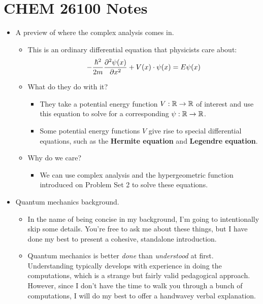 \documentclass[../finalProject.tex]{subfiles}
\begin{document}
\section*{CHEM 26100 Notes}
\begin{itemize}
    \item {}A preview of where the complex analysis comes in.
    \begin{itemize}
        \item This is an ordinary differential equation that physicists care about:
        \begin{equation*}
            -\frac{\hbar^2}{2m}\pdv[2]{\psi(x)}{x}+V(x)\cdot\psi(x) = E\psi(x)
        \end{equation*}
        \item What do they do with it?
        \begin{itemize}
            \item They take a potential energy function $V:\mathbb{R}\to\mathbb{R}$ of interest and use this equation to solve for a corresponding $\psi:\mathbb{R}\to\mathbb{R}$.
            \item Some potential energy functions $V$ give rise to special differential equations, such as the \textbf{Hermite equation} and \textbf{Legendre equation}.
        \end{itemize}
        \item Why do we care?
        \begin{itemize}
            \item We can use complex analysis and the hypergeometric function introduced on Problem Set 2 to solve these equations.
        \end{itemize}
    \end{itemize}
    \item Quantum mechanics background.
    \begin{itemize}
        \item In the name of being concise in my background, I'm going to intentionally skip some details. You're free to ask me about these things, but I have done my best to present a cohesive, standalone introduction.
        \item Quantum mechanics is better \emph{done} than \emph{understood} at first. Understanding typically develops with experience in doing the computations, which is a strange but fairly valid pedagogical approach. However, since I don't have the time to walk you through a bunch of computations, I will do my best to offer a handwavey verbal explanation.

\end{itemize}
\end{itemize}
\end{document}
